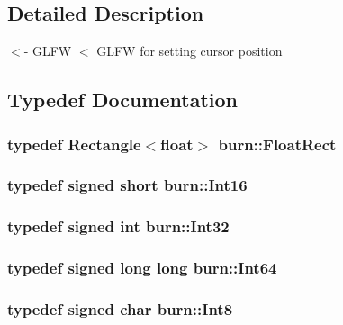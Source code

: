 \subsection{Detailed Description}
$<$-\/ G\-L\-F\-W $<$ G\-L\-F\-W for setting cursor position 

\subsection{Typedef Documentation}
\hypertarget{namespaceburn_a00aa73ce1ec2ed4393740a528395103f}{
\subsubsection[{Float\-Rect}]{\setlength{\rightskip}{0pt plus 5cm}typedef {\bf Rectangle}$<$float$>$ {\bf burn\-::\-Float\-Rect}}}\label{namespaceburn_a00aa73ce1ec2ed4393740a528395103f}
\hypertarget{namespaceburn_acf6023d96a6c61f3baa1f26a5d13a7c5}{
\subsubsection[{Int16}]{\setlength{\rightskip}{0pt plus 5cm}typedef signed short {\bf burn\-::\-Int16}}}\label{namespaceburn_acf6023d96a6c61f3baa1f26a5d13a7c5}
\hypertarget{namespaceburn_a96c2e82d6da686c64a6f330628466b05}{
\subsubsection[{Int32}]{\setlength{\rightskip}{0pt plus 5cm}typedef signed int {\bf burn\-::\-Int32}}}\label{namespaceburn_a96c2e82d6da686c64a6f330628466b05}
\hypertarget{namespaceburn_a924776a36487e4c21d67322ac918f021}{
\subsubsection[{Int64}]{\setlength{\rightskip}{0pt plus 5cm}typedef signed long long {\bf burn\-::\-Int64}}}\label{namespaceburn_a924776a36487e4c21d67322ac918f021}
\hypertarget{namespaceburn_afbbb36f91c077b8633b194b8ec441fa4}{
\subsubsection[{Int8}]{\setlength{\rightskip}{0pt plus 5cm}typedef signed char {\bf burn\-::\-Int8}}}\label{namespaceburn_afbbb36f91c077b8633b194b8ec441fa4}
